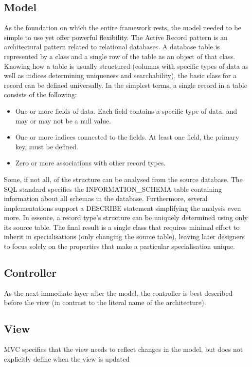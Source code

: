 \subsection{Model}
As the foundation on which the entire framework rests, the model needed to be simple to use yet offer powerful flexibility. The Active Record pattern is an architectural pattern related to relational databases. A database table is represented by a class and a single row of the table as an object of that class. Knowing how a table is usually structured (columns with specific types of data as well as indices determining uniqueness and searchability), the basic class for a record can be defined universally.
In the simplest terms, a single record in a table consists of the following:
\begin{itemize}
    \item One or more fields of data. Each field contains a specific type of data, and may or may not be a null value.
    \item One or more indices connected to the fields. At least one field, the primary key, must be defined.
    \item Zero or more associations with other record types.
\end{itemize}
Some, if not all, of the structure can be analysed from the source database. The SQL standard specifies the INFORMATION\_SCHEMA table containing information about all schemas in the database. Furthermore, several implementations support a DESCRIBE statement simplifying the analysis even more. In essence, a record type's structure can be uniquely determined using only its source table.
The final result is a single class that requires minimal effort to inherit in specialisations (only changing the source table), leaving later designers to focus solely on the properties that make a particular specialisation unique.

\subsection{Controller}
As the next immediate layer after the model, the controller is best described before the view (in contrast to the literal name of the architecture).

\subsection{View}
MVC specifies that the view needs to reflect changes in the model, but does not explicitly define when the view is updated
